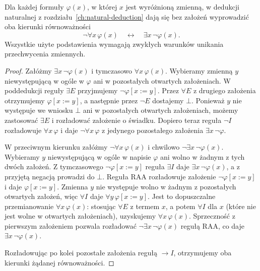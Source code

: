 \begin{lemat}\label{lem:henkin-quant-duality}
Dla każdej formuły $\varphi(x)$, w której $x$ jest wyróżnioną zmienną, w dedukcji naturalnej z rozdziału~\ref{ch:natural-deduction} dają się bez założeń wyprowadzić oba kierunki równoważności
\[
\neg\forall x\,\varphi(x)\quad\longleftrightarrow\quad\exists x\,\neg\varphi(x).
\]
Wszystkie użyte podstawienia wymagają zwykłych warunków unikania przechwycenia zmiennych.
\end{lemat}
\begin{proof}
Załóżmy $\exists x\,\neg\varphi(x)$ i tymczasowo $\forall x\,\varphi(x)$. Wybieramy zmienną $y$ niewystępującą w ogóle w $\varphi$ ani w pozostałych otwartych założeniach. W poddedukcji reguły $\exists E$ przyjmujemy $\neg\varphi[x:=y]$. Przez $\forall E$ z drugiego założenia otrzymujemy $\varphi[x:=y]$, a następnie przez $\neg E$ dostajemy $\bot$. Ponieważ $y$ nie występuje we wniosku $\bot$ ani w pozostałych otwartych założeniach, możemy zastosować $\exists E$ i rozładować założenie o świadku. Dopiero teraz reguła $\neg I$ rozładowuje $\forall x\,\varphi$ i daje $\neg\forall x\,\varphi$ z jedynego pozostałego założenia $\exists x\,\neg\varphi$.

W przeciwnym kierunku załóżmy $\neg\forall x\,\varphi(x)$ i chwilowo $\neg\exists x\,\neg\varphi(x)$. Wybieramy $y$ niewystępującą w ogóle w napisie $\varphi$ ani wolno w żadnym z tych dwóch założeń. Z tymczasowego $\neg\varphi[x:=y]$ reguła $\exists I$ daje $\exists x\,\neg\varphi(x)$, a z przyjętą negacją prowadzi do $\bot$. Reguła $\mathrm{RAA}$ rozładowuje założenie $\neg\varphi[x:=y]$ i daje $\varphi[x:=y]$. Zmienna $y$ nie występuje wolno w żadnym z pozostałych otwartych założeń, więc $\forall I$ daje $\forall y\,\varphi[x:=y]$. Jest to dopuszczalne przemianowanie $\forall x\,\varphi(x)$: stosując $\forall E$ z termem $x$, a potem $\forall I$ dla $x$ (które nie jest wolne w otwartych założeniach), uzyskujemy $\forall x\,\varphi(x)$. Sprzeczność z pierwszym założeniem pozwala rozładować $\neg\exists x\,\neg\varphi(x)$ regułą $\mathrm{RAA}$, co daje $\exists x\,\neg\varphi(x)$.

Rozładowując po kolei pozostałe założenia regułą $\to I$, otrzymujemy oba kierunki żądanej równoważności.
\end{proof}

